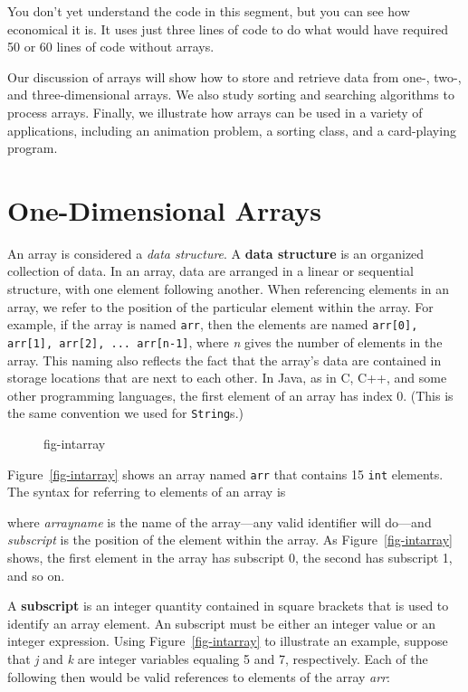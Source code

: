 \noindent You don't yet understand the code in this segment, but you can
see how economical it is. It uses just three lines of code to do what
would have required 50 or 60 lines of code without arrays. 

Our discussion of arrays will show how to store and retrieve data from
one-, two-, and three-dimensional arrays.  We also study sorting and
searching algorithms to process arrays. Finally, we illustrate how
arrays can be used in a variety of applications, including an
animation problem, a sorting class, and a card-playing \mbox{program.}

\section{One-Dimensional Arrays}
\label{one-dimensional-arrays}

\noindent An array is considered a {\em data structure}. A {\bf data
structure} is an organized collection of data. In an array, data are
arranged  in a linear or
sequential structure, with one element following another.  When
referencing elements in an array, we refer to the position of the
particular element within the array. For example, if the array is
named {\tt arr}, then the elements are named
\verb|arr[0], arr[1], arr[2], ... arr[n-1]|, where {\it n} gives the
number of elements in the array.  This naming also reflects the fact
that the array's data are contained in storage locations that are next
to each other. In Java, as in C, C++, and some other programming
languages, the first element of an array has index 0.
(This is the same convention we used for {\tt String}s.)

\begin{figure}[h!]
{fig-intarray}
\end{figure}
Figure~\ref{fig-intarray} shows an array named {\tt arr} that
contains 15 {\tt int} elements.  
The syntax for referring to elements of an array is


\noindent where {\it arrayname} is the name of the array---any valid
identifier will do---and {\it subscript} is the position of the
element within the array. As Figure~\ref{fig-intarray} shows, the
first element in the array has subscript 0, the second has subscript
1, and so on.


A {\bf subscript} is an integer quantity contained in square brackets
that is used to identify an array element. An subscript must be
either an integer value or an integer
expression.  Using Figure~\ref{fig-intarray} to illustrate an example,
suppose that {\it j} and {\it k} are integer variables equaling 5 and
7, respectively.  Each of the following then would be valid references
to elements of the array {\it arr}:

